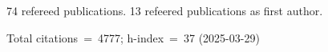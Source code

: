 74 refereed publications. 13 refeered publications as first author.

Total citations~=~4777; h-index~=~37 (2025-03-29)